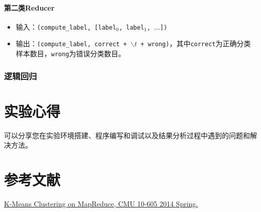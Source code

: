 \documentclass{ML}
\begin{document}
\paragraph{第二类Reducer}
\begin{itemize}
    \item 输入：\texttt{(compute\_label, [label$_0$, label$_1$, $\dots$])}
    \item 输出：\texttt{(compute\_label, correct + $\backslash t$ + wrong)}，其中\texttt{correct}为正确分类样本数目，\texttt{wrong}为错误分类数目。
\end{itemize}


\subsubsection{逻辑回归}
\section{实验心得}
可以分享您在实验环境搭建、程序编写和调试以及结果分析过程中遇到的问题和解决方法。
\appendix

\section{参考文献}
\begin{thebibliography}{20}
     \href{http://curtis.ml.cmu.edu/w/courses/index.php/Syllabus_for_Machine_Learning_with_Large_Datasets_10-605_in_Spring_2014}{K-Means Clustering on MapReduce, CMU 10-605 2014 Spring.}
\end{thebibliography}
\end{document}
